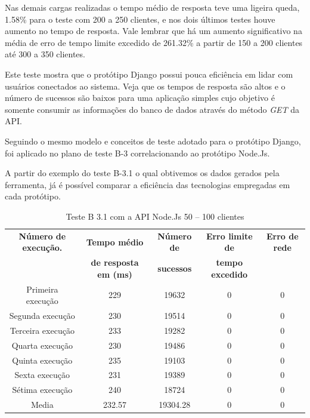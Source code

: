   Nas demais cargas realizadas o tempo médio de resposta teve uma ligeira queda, 1.58\% para o teste com 200 a 250 clientes, e nos dois
  últimos testes houve aumento no tempo de resposta. Vale lembrar que há um aumento significativo na média de erro de tempo limite
  excedido de 261.32\% a partir de 150 a 200 clientes até 300 a 350 clientes.

  Este teste mostra que o protótipo Django possui pouca eficiência em lidar com usuários conectados ao sistema. Veja que os tempos de
  resposta são altos e o número de sucessos são baixos para uma aplicação simples cujo objetivo é somente consumir as informações do banco de
  dados através do método \textit{GET} da API.

  Seguindo o mesmo modelo e conceitos de teste adotado para o protótipo Django, foi aplicado no plano de teste
  B-3 correlacionando ao protótipo Node.Js.

  A partir do exemplo do teste B-3.1 o qual obtivemos os dados gerados pela ferramenta, já é possível comparar a eficiência das
  tecnologias empregadas em cada protótipo.

  \begin{table}[H]
    \centering
    \footnotesize
    \setlength{\abovecaptionskip}{0pt}
    \setlength{\belowcaptionskip}{0pt}
    \caption[Teste B-3.1 com a API Node.Js 50 – 100 clientes]{Teste B 3.1 com a API Node.Js 50 – 100 clientes}
    \label{tab:teste-b-3-1}
    \begin{tabular}{c|c|c|c|c}
      \hline \hline
      \textbf{Número de execução.} & \textbf{Tempo médio } &	\textbf{Número de } & \textbf{Erro limite de} & \textbf{Erro de rede}  \\
      {}			   & \textbf{de resposta em (ms) } &\textbf{sucessos } & \textbf{tempo excedido} & {}  \\
      \hline \hline
      Primeira execução &	229 &				19632 &			0 &				0 \\
      Segunda execução &	230 &				19514 &			0 &				0 \\
      Terceira execução &	233 &				19282 &			0 &				0 \\
      Quarta execução  &	230 &				19486 &			0 &				0 \\
      Quinta execução  &	235 &				19103 &			0 &				0 \\
      Sexta execução   &	231 &				19389 &			0 &				0 \\
      Sétima execução  &	240 &				18724 &			0 &				0 \\
      Media & 			232.57 &			19304.28 & 		0 &				0 \\
      \hline \hline
    \end{tabular}
  \end{table}

